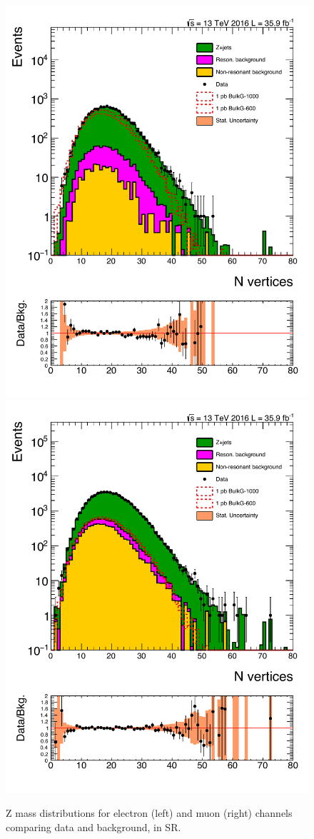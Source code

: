 \begin{figure}[htbp!]
\centering
\includegraphics[width=0.46\linewidth,page=8]{figures/ReMiniSummer16_DT_PhReMiniMCRcFixXsec_GMCPhPtWt_SRdPhiGT0p5_puWeightsummer16_muoneg_gjet_metfilter_unblind_el_log_1pb.pdf}
\includegraphics[width=0.46\linewidth,page=8]{figures/ReMiniSummer16_DT_PhReMiniMCRcFixXsec_GMCPhPtWt_SRdPhiGT0p5_puWeightsummer16_muoneg_gjet_metfilter_unblind_mu_log_1pb.pdf}
\caption{Z mass distributions for electron (left) and muon (right) channels
comparing data and background, in SR.}
\label{fig:SR_gjet_mz}
\end{figure}

